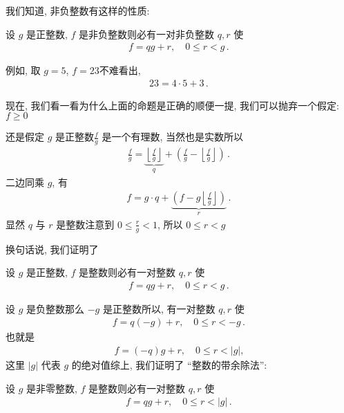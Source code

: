 我们知道, 非负整数有这样的性质:

\begin{proposition}
    设 $g$ 是正整数, $f$ 是非负整数\period 则必有一对非负整数 $q,r$ 使
    \begin{align*}
        f = qg + r, \quad 0 \leq r < g \period
    \end{align*}
\end{proposition}

例如, 取 $g=5$, $f=23$\period 不难看出,
\begin{align*}
    23 = 4 \cdot 5 + 3 \period
\end{align*}

现在, 我们看一看为什么上面的命题是正确的\period 顺便一提, 我们可以抛弃一个假定: $f \geq 0$\period

还是假定 $g$ 是正整数\period $\frac{f}{g}$ 是一个有理数, 当然也是实数\period 所以
\begin{align*}
    \frac{f}{g} = \underbrace{\left\lfloor \frac{f}{g} \right\rfloor}_{q} + \left( \frac{f}{g} - \left\lfloor \frac{f}{g} \right\rfloor \right) \period
\end{align*}
二边同乘 $g$, 有
\begin{align*}
    f = g \cdot q + \underbrace{\left( f - g\left\lfloor \frac{f}{g} \right\rfloor \right)}_{r} \period
\end{align*}
显然 $q$ 与 $r$ 是整数\period 注意到 $0 \leq \frac{r}{g} < 1$, 所以 $0 \leq r < g$\period

换句话说, 我们证明了
\begin{proposition}
    设 $g$ 是正整数, $f$ 是整数\period 则必有一对整数 $q,r$ 使
    \begin{align*}
        f = qg + r, \quad 0 \leq r < g \period
    \end{align*}
\end{proposition}

设 $g$ 是负整数\period 那么 $-g$ 是正整数\period 所以, 有一对整数 $q,r$ 使
\begin{align*}
    f = q(-g) + r, \quad 0 \leq r < -g \period
\end{align*}
也就是
\begin{align*}
    f = (-q)g + r, \quad 0 \leq r < |g|,
\end{align*}
这里 $|g|$ 代表 $g$ 的绝对值\period 综上, 我们证明了 ``整数的带余除法'':
\begin{proposition}
    设 $g$ 是非零整数, $f$ 是整数\period 则必有一对整数 $q,r$ 使
    \begin{align*}
        f = qg + r, \quad 0 \leq r < |g| \period
    \end{align*}
\end{proposition}

